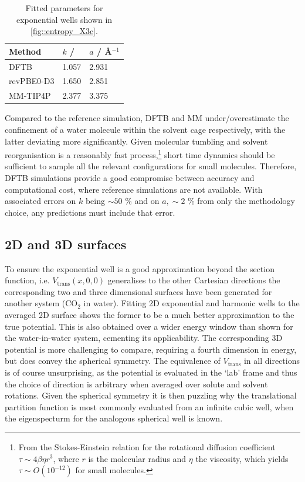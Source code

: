 \documentclass[../main.tex]{subfiles}
\begin{document}
\begin{table}[h!]
	\renewcommand{\arraystretch}{1.5}
	\begin{center}
		\small
		\begin{tabularx}{\textwidth}{YYY} 
			\toprule
			Method & $k$ / \kcal & $a$ / \AA$^{-1}$ \\
			\hline
			DFTB             &   1.057  & 2.931 \\
			revPBE0-D3  &   1.650  & 2.851 \\
			MM-TIP4P     &   2.377 & 3.375 \\
			\bottomrule
		\end{tabularx}
	\end{center}
	\caption{Fitted parameters for exponential wells shown in \figurename{ \ref{fig::entropy_X3c}}.} 
	\label{table::figX3c_params}
\end{table}
\vspace{0.9cm}
Compared to the reference simulation, DFTB and MM under/overestimate the confinement of a water molecule within the solvent cage respectively, with the latter deviating more significantly. Given molecular tumbling and solvent reorganisation is a reasonably fast process,\footnote{From the Stokes-Einstein relation for the rotational diffusion coefficient $\tau \sim 4\beta\eta r^3$, where $r$ is the molecular radius and $\eta$ the viscosity, which yields $\tau \sim O(10^{-12})$ for small molecules.} short time dynamics should be sufficient to sample all the relevant configurations for small molecules. Therefore, DFTB simulations provide a good compromise between accuracy and computational cost, where reference simulations are not available. With associated errors on $k$ being $\sim 50$ \% and on $a, \sim 2$ \% from only the methodology choice, any predictions must include that error.


\subsection{2D and 3D surfaces}

To ensure the exponential well is a good approximation beyond the section function, i.e. $V_\text{trans}(x, 0, 0)$ generalises to the other Cartesian directions the corresponding two and three dimensional surfaces have been generated for another system (CO$_2$ in water). Fitting 2D exponential and harmonic wells to the averaged 2D surface shows the former to be a much better approximation to the true potential. This is also obtained over a wider energy window than shown for the water-in-water system, cementing its applicability. The corresponding 3D potential is more challenging to compare, requiring a fourth dimension in energy, but does convey the spherical symmetry. The equivalence of $V_\text{trans}$ in all directions is of course unsurprising, as the potential is evaluated in the `lab' frame and thus the choice of direction is arbitrary when averaged over solute and solvent rotations. Given the spherical symmetry it is then puzzling why the translational partition function is most commonly evaluated from an infinite cubic well, when the eigenspecturm for the analogous spherical well is known.\cite{Huang2016}
\end{document}
